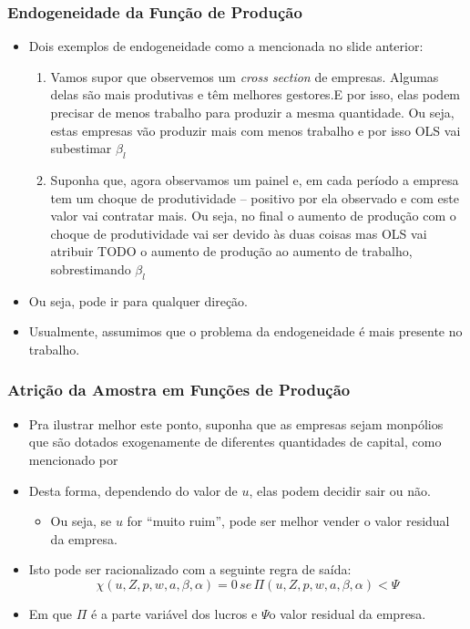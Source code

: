 \documentclass{beamer}
\begin{document}
\begin{frame}\frametitle{Endogeneidade da Função de Produção}

\scriptsize
\begin{itemize}
\item Dois exemplos de endogeneidade como a mencionada no slide anterior:

\begin{enumerate}
\item Vamos supor que observemos um \emph{cross section }de empresas. Algumas
delas são mais produtivas e têm melhores gestores.E por isso, elas
podem precisar de menos trabalho para produzir a mesma quantidade.
Ou seja, estas empresas vão produzir mais com menos trabalho e por
isso OLS vai subestimar $\beta_{l}$
\item Suponha que, agora observamos um painel e, em cada período a empresa
tem um choque de produtividade -- positivo por ela observado
e com este valor vai contratar mais. Ou seja, no final o aumento de
produção com o choque de produtividade vai ser devido às duas coisas
mas OLS vai atribuir TODO o aumento de produção ao aumento de trabalho,
sobrestimando $\beta_{l}$
\end{enumerate}
\item Ou seja, pode ir para qualquer direção. 
\item Usualmente, assumimos que o problema da endogeneidade é mais presente
no trabalho.
\end{itemize}
\end{frame}

\begin{frame}\frametitle{Atrição da Amostra em Funções de Produção}

\begin{itemize}
\item Pra ilustrar melhor este ponto, suponha que as empresas sejam monpólios
que são dotados exogenamente de diferentes quantidades de capital, como mencionado por \citet{Griliches1995b}
\item Desta forma, dependendo do valor de $u$, elas podem decidir sair
ou não. 

\begin{itemize}
\item Ou seja, se $u$ for ``muito ruim'', pode ser melhor vender o valor
residual da empresa.
\end{itemize}
\item Isto pode ser racionalizado com a seguinte regra de saída:
\[
\chi(u,Z,p,w,a,\beta,\alpha)=0\,se\,\Pi(u,Z,p,w,a,\beta,\alpha)<\Psi
\]
\item Em que $\Pi$ é a parte variável dos lucros e $\Psi$o valor residual
da empresa.
\end{itemize}
\end{frame}
\end{document}
